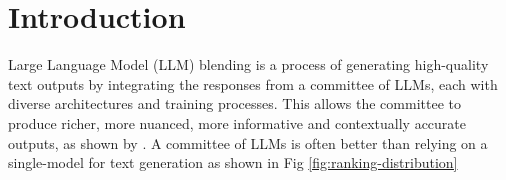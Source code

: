 \documentclass[sigconf,authordraft]{acmart}
\begin{document}




\maketitle

\section{Introduction}

Large Language Model (LLM) blending is a process of generating high-quality text outputs by integrating the responses from a committee of LLMs, each with diverse architectures and training processes. This allows the committee to produce richer, more nuanced, more informative and contextually accurate outputs, as shown by \cite{jiang-etal-2023-llm}. A committee of LLMs is often better than relying on a single-model for text generation as shown in Fig \ref{fig:ranking-distribution}
\end{document}
